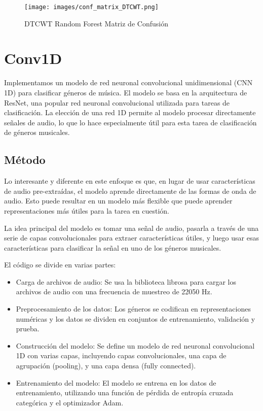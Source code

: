 \documentclass[colorinlistoftodos,twoside,twocolumn,10pt]{article} %
\begin{document}
\begin{figure}[h!] 
	\centering    
	\texttt{[image: images/conf\_matrix\_DTCWT.png]}    
	\caption{DTCWT Random Forest Matriz de Confusi\'on}
\end{figure}

\section{Conv1D}
Implementamos un modelo de red neuronal convolucional unidimensional (CNN 1D) para clasificar g\'eneros de m\'usica. El modelo se basa en la arquitectura de ResNet, una popular red neuronal convolucional utilizada para tareas de clasificaci\'on. La elecci\'on de una red 1D permite al modelo procesar directamente se\~nales de audio, lo que lo hace especialmente \'util para esta tarea de clasificaci\'on de g\'eneros musicales.

\subsection{M\'etodo}
Lo interesante y diferente en este enfoque es que, en lugar de usar caracter\'isticas de audio pre-extra\'idas, el modelo aprende directamente de las formas de onda de audio. Esto puede resultar en un modelo m\'as flexible que puede aprender representaciones m\'as \'utiles para la tarea en cuesti\'on.

La idea principal del modelo es tomar una se\~nal de audio, pasarla a trav\'es de una serie de capas convolucionales para extraer caracter\'isticas \'utiles, y luego usar esas caracter\'isticas para clasificar la se\~nal en uno de los g\'eneros musicales.

El c\'odigo se divide en varias partes:
\begin{itemize}
\item Carga de archivos de audio: Se usa la biblioteca librosa para cargar los archivos de audio con una frecuencia de muestreo de 22050 Hz.
\item Preprocesamiento de los datos: Los g\'eneros se codifican en representaciones num\'ericas y los datos se dividen en conjuntos de entrenamiento, validaci\'on y prueba.
\item Construcci\'on del modelo: Se define un modelo de red neuronal convolucional 1D con varias capas, incluyendo capas convolucionales, una capa de agrupaci\'on (pooling), y una capa densa (fully connected).
\item Entrenamiento del modelo: El modelo se entrena en los datos de entrenamiento, utilizando una funci\'on de p\'erdida de entrop\'ia cruzada categ\'orica y el optimizador Adam.
\end{itemize}
\end{document}
